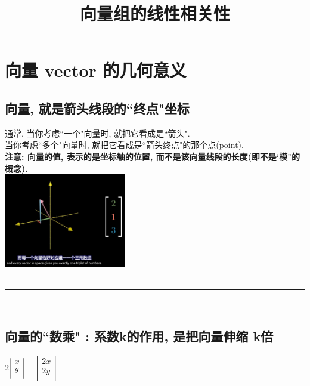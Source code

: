 \documentclass[UTF8]{ctexart}
\title{向量组的线性相关性}
\begin{document}
\tableofcontents %
\date{} %
\maketitle  %

\section{向量 vector 的几何意义}

\subsection{向量, 就是箭头线段的``终点"坐标}

通常, 当你考虑``一个"向量时, 就把它看成是``箭头". \\
当你考虑``多个"向量时, 就把它看成是``箭头终点"的那个点(point).\\

\textbf{注意: 向量的值, 表示的是坐标轴的位置, 而不是该向量线段的长度(即不是`模"的概念).}\\

\includegraphics[width=0.4\textwidth]{img/0066.png}\\




~\\
\hrule
~\\

\subsection{向量的``数乘" : 系数k的作用, 是把向量伸缩 k倍}

$2\left| \begin{array}{l}
		x \\
		y \\
	\end{array} \right|=\left| \begin{array}{l}
		2x \\
		2y \\
	\end{array} \right|
$\\
\end{document}
